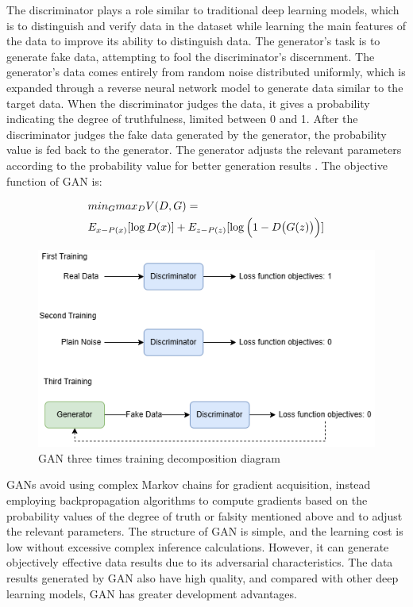 \documentclass[10pt,journal,compsoc]{IEEEtran}
\begin{document}
The discriminator plays a role similar to traditional deep learning models, which is to distinguish and verify data in the dataset while learning the main features of the data to improve its ability to distinguish data. The generator's task is to generate fake data, attempting to fool the discriminator's discernment. The generator's data comes entirely from random noise distributed uniformly, which is expanded through a reverse neural network model to generate data similar to the target data. When the discriminator judges the data, it gives a probability indicating the degree of truthfulness, limited between 0 and 1. After the discriminator judges the fake data generated by the generator, the probability value is fed back to the generator. The generator adjusts the relevant parameters according to the probability value for better generation results \cite{7}. The objective function of GAN is:

\begin{equation}
    \begin{aligned}
        &min_G max_D V(D, G) = \\
        &E_{x-P(x)} [\log {D(x)}] + E_{z-P(z)} [\log {\Bigl(1-D \bigl(G(z)\bigr) \Bigr)}]
    \end{aligned}
\end{equation}

\begin{figure}
    \centering
    \includegraphics[scale=0.5] {PNG/2-2.png}
    \caption{GAN three times training decomposition diagram}
    \label{fig:2-2}
\end{figure}

GANs avoid using complex Markov chains for gradient acquisition, instead employing backpropagation algorithms to compute gradients based on the probability values of the degree of truth or falsity mentioned above and to adjust the relevant parameters. The structure of GAN is simple, and the learning cost is low without excessive complex inference calculations. However, it can generate objectively effective data results due to its adversarial characteristics. The data results generated by GAN also have high quality, and compared with other deep learning models, GAN has greater development advantages.
\end{document}
